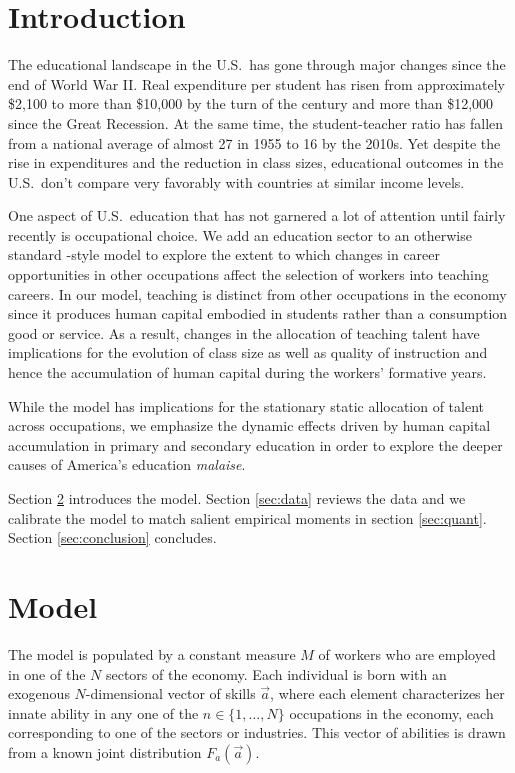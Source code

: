 \documentclass[onehalfspacing,11pt]{article}
\begin{document}
\section{Introduction}
The educational landscape in the U.S.~has gone through major changes since the end of World War II. Real expenditure per student has risen from approximately \$2,100 to more than \$10,000 by the turn of the century and more than \$12,000 since the Great Recession. At the same time, the student-teacher ratio has fallen from a national average of almost 27 in 1955 to 16 by the 2010s. Yet despite the rise in expenditures and the reduction in class sizes, educational outcomes in the U.S.~don't compare very favorably with countries at similar income levels.

One aspect of U.S.~education that has not garnered a lot of attention until fairly recently is occupational choice. We add an education sector to an otherwise standard \cite{Hsieh:2018}-style model to explore the extent to which changes in career opportunities in other occupations affect the selection of workers into teaching careers. In our model, teaching is distinct from other occupations in the economy since it produces human capital embodied in students rather than a consumption good or service. As a result, changes in the allocation of teaching talent have implications for the evolution of class size as well as quality of instruction and hence the accumulation of human capital during the workers' formative years.

While the model has implications for the stationary static allocation of talent across occupations, we emphasize the dynamic effects driven by human capital accumulation in primary and secondary education in order to explore the deeper causes of America's education \textit{malaise}.

Section \ref{sec:model} introduces the model. Section \ref{sec:data} reviews the data and we calibrate the model to match salient empirical moments in section \ref{sec:quant}. Section \ref{sec:conclusion} concludes.

\section{Model}\label{sec:model}
The model is populated by a constant measure $M$ of workers who are employed in one of the $N$ sectors of the economy. Each individual is born with an exogenous $N$-dimensional vector of skills $\vec{a}$, where each element characterizes her innate ability in any one of the $n \in \{1,\ldots,N\}$ occupations in the economy, each corresponding to one of the sectors or industries. This vector of abilities is drawn from a known joint distribution $F_a(\vec{a})$.
\end{document}
